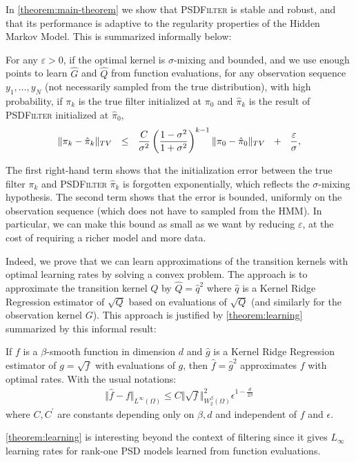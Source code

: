 In \cref{theorem:main-theorem} we show that \textsc{PSDFilter} is stable and robust, and that its performance is adaptive to the regularity properties of the Hidden Markov Model. This is summarized informally below:
\begin{mdframed}
\begin{informaltheorem}
For any $\varepsilon > 0$, if the optimal kernel is $\sigma$-mixing and bounded, and we use enough points to learn $\hat G$ and $\hat Q$ from function evaluations, for any observation sequence $y_1, \ldots, y_N$ (not necessarily sampled from the true distribution), with high probability, if $\pi_k$ is the true filter initialized at $\pi_0$ and $\hat \pi_k$ is the result of \textsc{PSDFilter} initialized at $\hat \pi_0$,
\begin{align*}
    \Vert \pi_k - \hat\pi_k\Vert_{TV} ~~\leq~~ \frac{C}{\sigma^2}\left(\frac{1-\sigma^2}{1 + \sigma^2}\right)^{k-1}\|\pi_0 - \hat{\pi}_0\|_{TV} ~~+~~ \frac{\varepsilon}{\sigma},
\end{align*}
\end{informaltheorem}
\end{mdframed}
The first right-hand term shows that the initialization error between the true filter $\pi_k$ and \textsc{PSDFilter} $\hat \pi_k$ is forgotten exponentially, which reflects the $\sigma$-mixing hypothesis. The second term shows that the error is bounded, uniformly on the observation sequence (which does not have to sampled from the HMM). In particular, we can make this bound as small as we want by reducing $\varepsilon$, at the cost of requiring a richer model and more data.

Indeed, we prove that we can learn approximations of the transition kernels with optimal learning rates by solving a convex problem. The approach is to approximate the transition kernel $Q$ by $\hat Q = \hat q^2$ where $\hat q$ is a Kernel Ridge Regression estimator of $\sqrt{Q}$ based on evaluations of $\sqrt{Q}$ (and similarly for the observation kernel $G$). This approach is justified by \cref{theorem:learning} summarized by this informal result:
\begin{mdframed}
\begin{informaltheorem}
If $f$ is a $\beta$-smooth function in dimension $d$ and $\hat g$ is a Kernel Ridge Regression estimator of $g = \sqrt{f}$ with evaluations of $g$, then $\hat f = \hat g^2$ approximates $f$ with optimal rates. With the usual notations:
\begin{align}
    \Vert \hat f - f \Vert_{L^\infty(\Omega)}\leq C \Vert \sqrt{f}\Vert_{W^\beta_2(\Omega)}^2\epsilon^{1-\frac{d}{2\beta}}
\end{align}
where $C, C^\prime$ are constants depending only on $\beta, d$ and independent of $f$ and $\epsilon$.
\end{informaltheorem}
\end{mdframed}
\noindent \cref{theorem:learning} is interesting beyond the context of filtering since it gives $L_\infty$ learning rates for rank-one PSD models learned from function evaluations.

